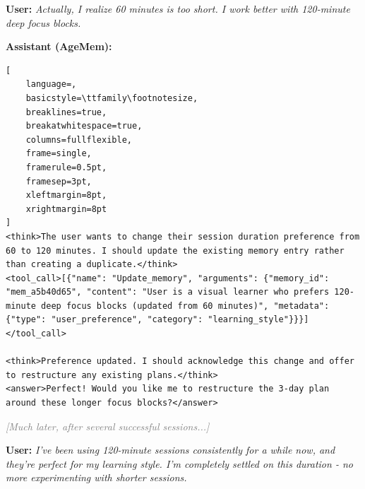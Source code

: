 \vspace{0.2cm}
\noindent\textbf{User:} \textit{Actually, I realize 60 minutes is too short. I work better with 120-minute deep focus blocks.}

\vspace{0.2cm}
\noindent\textbf{Assistant (AgeMem):}
\begin{footnotesize}
\begin{lstlisting}[
    language=,
    basicstyle=\ttfamily\footnotesize,
    breaklines=true,
    breakatwhitespace=true,
    columns=fullflexible,
    frame=single,
    framerule=0.5pt,
    framesep=3pt,
    xleftmargin=8pt,
    xrightmargin=8pt
]
<think>The user wants to change their session duration preference from 60 to 120 minutes. I should update the existing memory entry rather than creating a duplicate.</think>
<tool_call>[{"name": "Update_memory", "arguments": {"memory_id": "mem_a5b40d65", "content": "User is a visual learner who prefers 120-minute deep focus blocks (updated from 60 minutes)", "metadata": {"type": "user_preference", "category": "learning_style"}}}]</tool_call>

<think>Preference updated. I should acknowledge this change and offer to restructure any existing plans.</think>
<answer>Perfect! Would you like me to restructure the 3-day plan 
around these longer focus blocks?</answer>
\end{lstlisting}
\end{footnotesize}

\vspace{0.25cm}
\noindent\textcolor{gray}{\textit{[Much later, after several successful sessions...]}}

\vspace{0.2cm}
\noindent\textbf{User:} \textit{I've been using 120-minute sessions consistently for a while now, and they're perfect for my learning style. I'm completely settled on this duration - no more experimenting with shorter sessions.}

